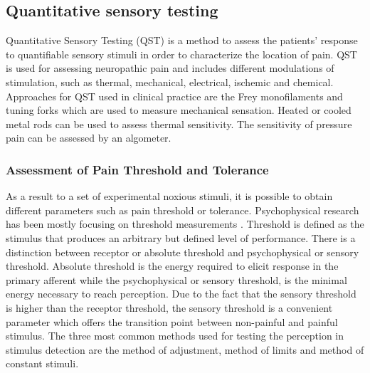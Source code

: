 \subsection{Quantitative sensory testing}
Quantitative Sensory Testing (QST) is a method to assess the patients' response to quantifiable sensory stimuli in order to characterize the location of pain. QST is used for assessing neuropathic pain and includes different modulations of stimulation, such as thermal, mechanical, electrical, ischemic and chemical. %
Approaches for QST used in clinical practice are the Frey monofilaments and tuning forks which are used to measure mechanical sensation. Heated or cooled metal rods can be used to assess thermal sensitivity. The sensitivity of pressure pain can be assessed by an algometer. \cite{Fillingim2016}


\subsubsection{Assessment of Pain Threshold and Tolerance}\label{AoPT}

As a result to a set of experimental noxious stimuli, it is possible to obtain different parameters such as pain threshold or tolerance. 
Psychophysical research has been mostly focusing on threshold measurements \cite{Pelli2010}.
Threshold is defined as the stimulus that produces an arbitrary but defined level of performance. There is a distinction between receptor or absolute threshold and psychophysical or sensory threshold. Absolute threshold is the energy required to elicit response in the primary afferent while the psychophysical or sensory threshold, is the minimal energy necessary to reach perception. Due to the fact that the sensory threshold is higher than the receptor threshold,  the sensory threshold is a convenient parameter which offers the transition point between non-painful and painful stimulus.\cite{Yarnitsky2006} %
The three most common methods used for testing the perception in stimulus detection are the method of adjustment, method of limits and method of constant stimuli.


